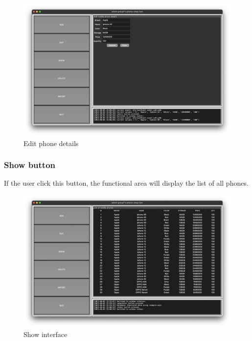 \documentclass[12pt,oneside,a4paper]{article}
\begin{document}
\begin{figure}[H]
  \centerline{\includegraphics[scale=0.35]{edit-entry-clicked.png}}
  \caption{Edit phone details}
\end{figure}

\subsubsection{Show button}
If the user click this button, the functional area will display the list of all phones.
\vspace{4cm}
\begin{figure}[H]
  \centerline{\includegraphics[scale=0.35]{show-clicked.png}}
  \caption{Show interface}
\end{figure}

\newpage
\end{document}
